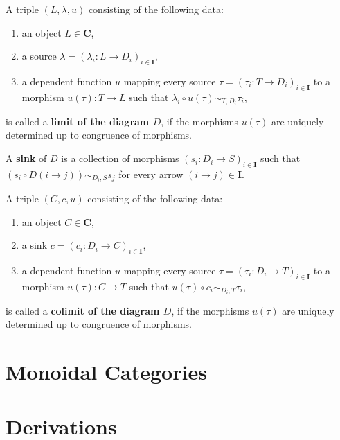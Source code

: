 \begin{definition}
 A triple $(L, \lambda, u)$ consisting of the following data:
 \begin{enumerate}
  \item an object $L \in \mathbf{C}$,
  \item a source $\lambda = ( \lambda_i: L \rightarrow D_i)_{i \in \mathbf{I}}$,
  \item a dependent function $u$ mapping every source $\tau = ( \tau_i: T \rightarrow D_i )_{i \in \mathbf{I}}$
        to a morphism $u( \tau ): T \rightarrow L$ such that
        $\lambda_i \circ u( \tau ) \sim_{T,D_i} \tau_i$,
 \end{enumerate}
 is called a \textbf{limit of the diagram $D$}, if the morphisms $u(\tau)$ are uniquely determined up to
 congruence of morphisms.
\end{definition}

\begin{definition}
 A \textbf{sink} of $D$ is a collection of morphisms $( s_i: D_i \rightarrow S )_{i \in \mathbf{I}}$
 such that $\left(s_i \circ D( i \rightarrow j )\right) \sim_{D_i, S} s_j$ for every arrow $(i \rightarrow j) \in \mathbf{I}$.
\end{definition}


\begin{definition}
 A triple $(C, c, u)$ consisting of the following data:
 \begin{enumerate}
  \item an object $C \in \mathbf{C}$,
  \item a sink $c = ( c_i: D_i \rightarrow C )_{i \in \mathbf{I}}$,
  \item a dependent function $u$ mapping every source $\tau = ( \tau_i: D_i \rightarrow T )_{i \in \mathbf{I}}$
        to a morphism $u( \tau ): C \rightarrow T$ such that
        $u(\tau) \circ c_{i} \sim_{D_i,T} \tau_i$,
 \end{enumerate}
 is called a \textbf{colimit of the diagram $D$}, if the morphisms $u(\tau)$ are uniquely determined up to
 congruence of morphisms.
\end{definition}

\section{Monoidal Categories}

\section{Derivations}\label{section:derivations}